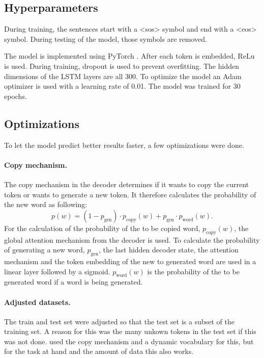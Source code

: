 \documentclass[a4paper, 12pt]{report}
\begin{document}
\subsection{Hyperparameters}
\label{sec:hyper}
During training, the sentences start with a <sos> symbol and end with a <eos> symbol.
During testing of the model, those symbols are removed.

The model is implemented using PyTorch \cite{pytorch}.
After each token is embedded, ReLu is used. During training, dropout is used to prevent overfitting. 
The hidden dimensions of the LSTM layers are all 300. 
To optimize the model an Adam optimizer is used with a learning rate of 0.01. 
The model was trained for 30 epochs.

\subsection{Optimizations}
To let the model predict better results faster, a few optimizations were done.
\paragraph{Copy mechanism.} The copy mechanism in the decoder determines if it wants to copy the current token or wants to generate a new token. 
It therefore calculates the probability of the new word as following:
\begin{equation}
    p(w) = (1 - p_{\text{gen}}) \cdot p_{\text{copy}}(w) + p_{\text{gen}} \cdot p_{\text{word}}(w).
\end{equation}
For the calculation of the probability of the to be copied word, $p_{\text{copy}}(w)$, the global attention mechanism from the decoder is used. 
To calculate the probability of generating a new word, $p_{\text{gen}}$, the last hidden decoder state, the attention mechanism and the token embedding of the new to generated word are used in a linear layer followed by a sigmoid.
$p_{\text{word}}(w)$ is the probability of the to be generated word if a word is being generated. 

\paragraph{Adjusted datasets.} The train and test set were adjusted so that the test set is a subset of the training set. 
A reason for this was the many unkown tokens in the test set if this was not done. 
 used the copy mechanism and a dynamic vocabulary for this, but for the task at hand and the amount of data this also works.
\end{document}
